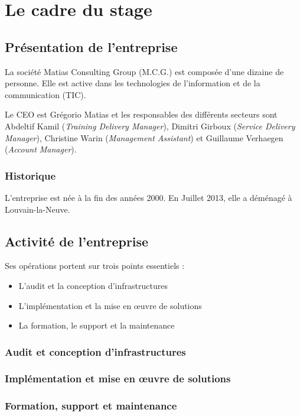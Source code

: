 \chapter{Le cadre du stage}
\section{Présentation de l'entreprise}
La société Matias Consulting Group (M.C.G.) est composée d'une dizaine de personne. 
Elle est active dans les technologies de l'information et de la communication (TIC).

Le CEO est Grégorio Matias et les responsables des différents secteurs sont Abdeltif Kamil (\textit{Training Delivery Manager}), Dimitri Girboux (\textit{Service Delivery Manager}), Christine Warin (\textit{Management Assistant}) et Guillaume Verhaegen (\textit{Account Manager}).

\subsection{Historique}
L'entreprise est née à la fin des années 2000.
En Juillet 2013, elle a déménagé à Louvain-la-Neuve.

\section{Activité de l'entreprise}

Ses opérations portent sur trois points essentiels : 
\begin{itemize}
	\item L'audit et la conception d'infrastructures
	\item L'implémentation et la mise en œuvre de solutions
	\item La formation, le support et la maintenance
\end{itemize}

\subsection{Audit et conception d'infrastructures}

\subsection{Implémentation et mise en œuvre de solutions}

\subsection{Formation, support et maintenance}